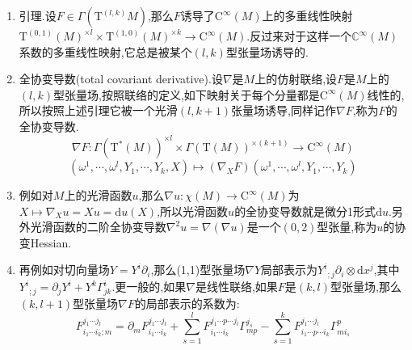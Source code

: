 \begin{enumerate}
\begin{proof}
    	我们只要证明在$\mathrm{T}^{(0,1)}M$上延拓的联络是唯一的,按照$(c)$就唯一的延拓到每个张量丛上.为此任取切向量场$Y$和余切向量场$\omega$,按照$(c)$有$\nabla_X(\omega\otimes Y)=(\nabla_X\omega)\otimes Y+\omega\otimes(\nabla_XY)$.按照(d)有$\nabla_X(\omega(Y))=\nabla(\mathrm{Tr}(\omega\otimes Y))=\mathrm{Tr}(\nabla(\omega\otimes Y))=\mathrm{Tr}((\nabla_X\omega)\otimes Y+\omega\otimes(\nabla_XY))=\nabla_X\omega(Y)+\omega(\nabla_XY)$.另外取局部坐标可以得到表示:
    	$$\nabla_X\omega=\left(X^i\partial_i\omega_k-X^i\omega_j\Gamma_{ik}^j\right)\mathrm{d}x^k$$
    \end{proof}
    \item 引理.设$F\in\Gamma(\mathrm{T}^{(l,k)}M)$,那么$F$诱导了$\mathrm{C}^{\infty}(M)$上的多重线性映射$\mathrm{T}^{(0,1)}(M)^{\times l}\times\mathrm{T}^{(1,0)}(M)^{\times k}\to\mathrm{C}^{\infty}(M)$.反过来对于这样一个$\mathbb{C}^{\infty}(M)$系数的多重线性映射,它总是被某个$(l,k)$型张量场诱导的.
    \item 全协变导数(total covariant derivative).设$\nabla$是$M$上的仿射联络,设$F$是$M$上的$(l,k)$型张量场,按照联络的定义,如下映射关于每个分量都是$\mathrm{C}^{\infty}(M)$线性的,所以按照上述引理它被一个光滑$(l,k+1)$张量场诱导,同样记作$\nabla F$,称为$F$的全协变导数.
    $$\nabla F:\Gamma(\mathrm{T}^*(M))^{\times l}\times\Gamma(\mathrm{T}(M))^{\times(k+1)}\to\mathrm{C}^{\infty}(M)$$
    $$(\omega^1,\cdots,\omega^l,Y_1,\cdots,Y_k,X)\mapsto(\nabla_XF)(\omega^1,\cdots,\omega^l,Y_1,\cdots,Y_k)$$
    \item 例如对$M$上的光滑函数$u$,那么$\nabla u:\chi(M)\to\mathrm{C}^{\infty}(M)$为$X\mapsto\nabla_Xu=Xu=\mathrm{d}u(X)$,所以光滑函数$u$的全协变导数就是微分1形式$\mathrm{d}u$.另外光滑函数的二阶全协变导数$\nabla^2u=\nabla(\nabla u)$是一个$(0,2)$型张量,称为$u$的协变Hessian.
    \item 再例如对切向量场$Y=Y^i\partial_i$,那么(1,1)型张量场$\nabla Y$局部表示为$Y^i_{\ \ ;j}\partial_i\otimes\mathrm{d}x^j$,其中$Y^i_{\ \ ;j}=\partial_jY^i+Y^k\Gamma_{jk}^i$.更一般的,如果$\nabla$是线性联络,如果$F$是$(k,l)$型张量场,那么$(k,l+1)$型张量场$\nabla F$的局部表示的系数为:
    $$F_{i_1\cdots i_k;m}^{j_1\cdots j_l}=\partial_mF_{i_1\cdots i_k}^{j_1\cdots j_l}+\sum_{s=1}^lF_{i_1\cdots i_k}^{j_1\cdots p\cdots j_l}\Gamma_{mp}^{j_s}-\sum_{s=1}^kF_{i_1\cdots p\cdots i_k}^{j_1\cdots j_l}\Gamma_{mi_s}^p$$
\end{enumerate}

